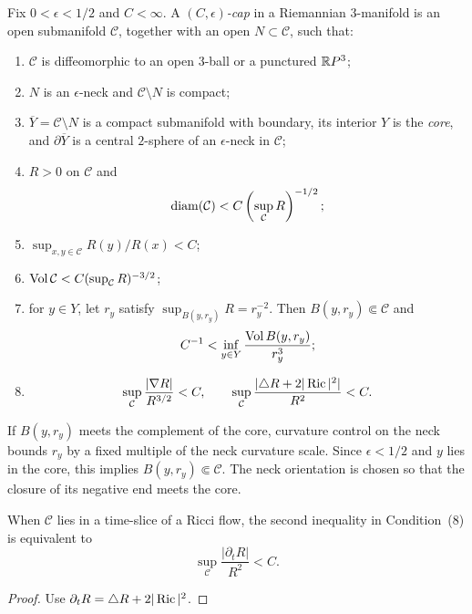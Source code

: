 \begin{definition}\label{def:c-epsilon-cap}
\label{epscap}

Fix $0<\epsilon<1/2$ and $C<\infty$. A
\emph{$(C,\epsilon)$-cap} in a Riemannian $3$-manifold is an open
submanifold $\mathcal C$, together with an open $N\subset\mathcal C$,
such that:
\begin{enumerate}
\item[(1)] $\mathcal C$ is diffeomorphic to an open $3$-ball or a
punctured $\mathbb{R} P^3$;
\item[(2)] $N$ is an $\epsilon$-neck and
$\mathcal C\setminus N$ is compact;
\item[(3)] $\overline Y=\mathcal C\setminus N$ is a compact
submanifold with boundary, its interior $Y$ is the \emph{core}, and
$\partial\overline Y$ is a central $2$-sphere of an
$\epsilon$-neck in $\mathcal C$;
\item[(4)] $R>0$ on $\mathcal C$ and
\[
 \operatorname{diam}(\mathcal C)<C\left(\sup_{\mathcal C}R\right)^{-1/2};
\]
\item[(5)] $\sup_{x,y\in\mathcal C}R(y)/R(x)<C$;
\item[(6)]
$\operatorname{Vol}\mathcal C<C(\sup_{\mathcal C}R)^{-3/2}$;
\item[(7)] for $y\in Y$, let $r_y$ satisfy
$\sup_{B(y,r_y)}R=r_y^{-2}$. Then
$B(y,r_y)\Subset\mathcal C$ and
\[
 C^{-1}<\inf_{y\in Y}\frac{\operatorname{Vol} B(y,r_y)}{r_y^3};
\]
\item[(8)]
\[
 \sup_{\mathcal C}\frac{|\nabla R|}{R^{3/2}}<C,
 \qquad
 \sup_{\mathcal C}\frac{|\triangle R+2|\operatorname{Ric}|^2|}{R^2}<C.
\]
\end{enumerate}
\end{definition}

\begin{remark}\label{rem:cap-core-ball-remark}

If $B(y,r_y)$ meets the complement of the core, curvature control on
the neck bounds $r_y$ by a fixed multiple of the neck curvature
scale. Since $\epsilon<1/2$ and $y$ lies in the core, this implies
$B(y,r_y)\Subset\mathcal C$. The neck orientation is chosen so that
the closure of its negative end meets the core.
\end{remark}

\begin{claim}\label{claim:cap-condition-time-derivative-equivalence}
\label{partialtR}

When $\mathcal C$ lies in a time-slice of a Ricci flow, the second
inequality in Condition~(8) is equivalent to
\[
 \sup_{\mathcal C}\frac{|\partial_tR|}{R^2}<C.
\]
\end{claim}
\begin{proof}
\sketch Use $\partial_tR=\triangle R+2|\operatorname{Ric}|^2$.
\end{proof}

